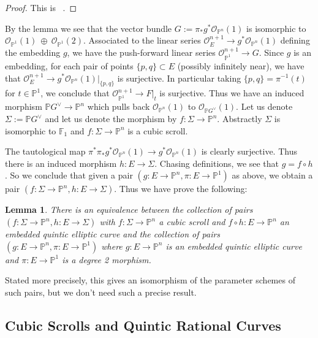\documentclass[amssymb,twoside,12 pt,amscd,reqno]{amsart}
\theoremstyle{plain}
\newtheorem{lem}[thm]{Lemma}
\theoremstyle{definition}
\newcommand{\PP}{\mathbb{P}}
\def\ps{\vspace{4pt}}
\newcommand{\OO}{\mathcal O}
\begin{document}
\begin{proof}
This is ~\cite[lemma 6.10]{HRS1}.
\end{proof}

By the lemma we see that the vector bundle $G:=\pi_* g^*
\OO_{\PP^n}(1)$ is isomorphic to $\OO_{\PP^1}(1)~\oplus~
\OO_{\PP^1}(2)$.  Associated to the linear series
$\OO_E^{n+1}\rightarrow g^*\OO_{\PP^n}(1)$ defining the embedding $g$,
we have the push-forward linear series $\OO_{\PP^1}^{n+1}\rightarrow
G$.  Since $g$ is an embedding, for each pair of points $\{p,q\}
\subset E$ (possibly infinitely near), we have that
$\OO_E^{n+1}\rightarrow g^*\OO_{\PP^n}(1)|_{\{p,q\}}$ is surjective.
In particular taking $\{p,q\}=\pi^{-1}(t)$ for $t\in \PP^1$, we
conclude that $\OO_{\PP^1}^{n+1}\rightarrow F|_t$ is surjective.  Thus
we have an induced morphism $\PP G^\vee \rightarrow \PP^n$ which pulls
back $\OO_{\PP^n}(1)$ to $\OO_{\PP G^\vee }(1)$.  Let us
denote $\Sigma := \PP G^\vee $ and let us denote the morphism by
$f:\Sigma\rightarrow \PP^n$.  Abstractly $\Sigma$ is isomorphic to
$\mathbb{F}_1$ and $f:\Sigma\rightarrow \PP^n$ is a cubic scroll.

\ps

The tautological map $\pi^*\pi_* g^*\OO_{\PP^n}(1)\rightarrow
g^*\OO_{\PP^n}(1)$ is clearly surjective.  Thus there is an induced
morphism $h:E\rightarrow \Sigma$.  Chasing definitions, we see that
$g=f\circ h$.  So we conclude that given a pair $(g:E\rightarrow
\PP^n, \pi:E\rightarrow \PP^1)$ as above, we obtain a pair
$(f:\Sigma\rightarrow \PP^n, h:E\rightarrow \Sigma)$.  Thus we
have prove the following:

\begin{lem}\label{lem-equiv1}
There is an equivalence between the collection of pairs
$(f:\Sigma\rightarrow \PP^n,h:E\rightarrow \Sigma)$ with
$f:\Sigma\rightarrow \PP^n$ a cubic scroll and $f\circ h:E\rightarrow
\PP^n$ an embedded quintic elliptic curve and the collection of pairs
$(g:E\rightarrow \PP^n, \pi:E\rightarrow \PP^1)$ where $g:E\rightarrow
\PP^n$ is an embedded quintic elliptic curve and $\pi:E\rightarrow
\PP^1$ is a degree 2 morphism.  
\end{lem}

Stated more precisely, this gives an
isomorphism of the parameter schemes of such pairs, but we don't need
such a precise result.


\subsection{Cubic Scrolls and Quintic Rational
Curves}~\label{subsec-scr50}
\end{document}
